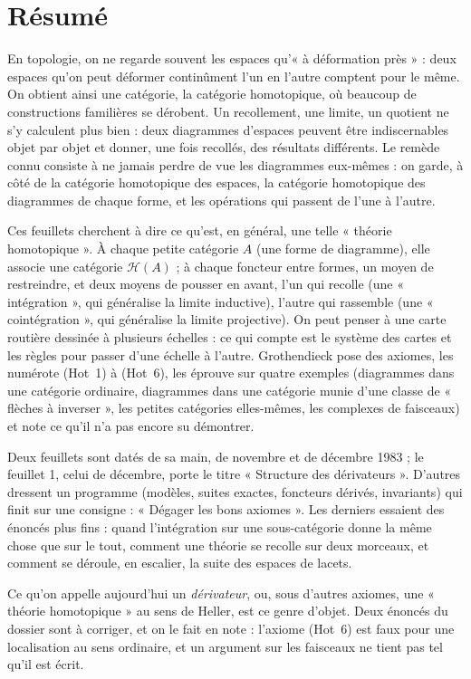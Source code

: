 \documentclass[11pt,a4paper]{article}
\begin{document}
\section*{Résumé}

\begin{resume}
En topologie, on ne regarde souvent les espaces qu'« à déformation près » :
deux espaces qu'on peut déformer continûment l'un en l'autre comptent pour le
même. On obtient ainsi une catégorie, la catégorie homotopique, où beaucoup
de constructions familières se dérobent. Un recollement, une limite, un
quotient ne s'y calculent plus bien : deux diagrammes d'espaces peuvent être
indiscernables objet par objet et donner, une fois recollés, des résultats
différents. Le remède connu consiste à ne jamais perdre de vue les
diagrammes eux-mêmes : on garde, à côté de la catégorie homotopique des
espaces, la catégorie homotopique des diagrammes de chaque forme, et les
opérations qui passent de l'une à l'autre.

Ces feuillets cherchent à dire ce qu'est, en général, une telle « théorie
homotopique ». À chaque petite catégorie $A$ (une forme de diagramme),
elle associe une catégorie $\mathcal H(A)$ ; à chaque foncteur entre formes,
un moyen de restreindre, et deux moyens de pousser en avant, l'un qui recolle
(une « intégration », qui généralise la limite inductive), l'autre qui
rassemble (une « cointégration », qui généralise la limite projective). On
peut penser à une carte routière dessinée à plusieurs échelles : ce qui
compte est le système des cartes et les règles pour passer d'une échelle à
l'autre. Grothendieck pose des axiomes, les numérote
(Hot~1) à (Hot~6), les éprouve sur quatre exemples (diagrammes dans une
catégorie ordinaire, diagrammes dans une catégorie munie d'une classe de
« flèches à inverser », les petites catégories elles-mêmes, les complexes de
faisceaux) et note ce qu'il n'a pas encore su démontrer.

Deux feuillets sont datés de sa main, de novembre et de décembre 1983 ; le
feuillet 1, celui de décembre, porte le titre « Structure des
dérivateurs ». D'autres dressent un programme (modèles, suites exactes, foncteurs dérivés, invariants) qui
finit sur une consigne : « Dégager les bons axiomes ». Les derniers essaient
des énoncés plus fins : quand l'intégration sur une sous-catégorie donne la
même chose que sur le tout, comment une théorie se recolle sur deux morceaux,
et comment se déroule, en escalier, la suite des espaces de lacets.

Ce qu'on appelle aujourd'hui un \emph{dérivateur}, ou, sous d'autres
axiomes, une « théorie homotopique » au sens de Heller, est ce genre
d'objet. Deux énoncés du dossier sont à corriger, et on le fait en
note : l'axiome (Hot~6) est faux pour une localisation au sens ordinaire, et
un argument sur les faisceaux ne tient pas tel qu'il est écrit.

\end{resume}
\end{document}
